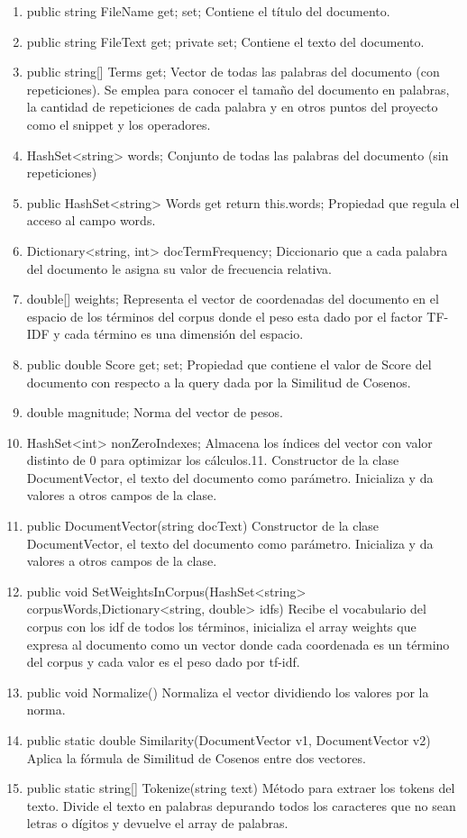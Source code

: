 \documentclass[a4paper,12pt,twocolumn]{article}
\begin{document}
\begin{enumerate}
    \item public string FileName {get; set; }
    Contiene el título del documento.
    \item public string FileText {get; private set; }
    Contiene el texto del documento.
    \item public string[] Terms{ get;}
    Vector de todas las palabras del documento (con repeticiones). Se emplea para conocer el
    tamaño del documento en palabras, la cantidad de repeticiones de cada palabra y en otros puntos
    del proyecto como el snippet y los operadores.
    \item HashSet<string> words;
    Conjunto de todas las palabras del documento (sin repeticiones)
    \item public HashSet<string> Words { get { return this.words; } }
    Propiedad que regula el acceso al campo words.
    \item Dictionary<string, int> docTermFrequency;
    Diccionario que a cada palabra del documento le asigna su valor de frecuencia relativa.
    \item double[] weights;
    Representa el vector de coordenadas del documento en el espacio de los términos del corpus
    donde el peso esta dado por el factor TF-IDF y cada término es una dimensión del espacio.
    \item public double Score { get; set; }
    Propiedad que contiene el valor de Score del documento con respecto a la query dada por la
    Similitud de Cosenos.
    \item double magnitude;
    Norma del vector de pesos.
    \item HashSet<int> nonZeroIndexes;
    Almacena los índices del vector con valor distinto de 0 para optimizar los cálculos.11. Constructor de la clase 
    DocumentVector, el texto del documento como parámetro. Inicializa y da
    valores a otros campos de la clase.
    \item public DocumentVector(string docText) {}
    Constructor de la clase DocumentVector, el texto del documento como parámetro. Inicializa y da
    valores a otros campos de la clase.
    \item public void SetWeightsInCorpus(HashSet<string> corpusWords,Dictionary<string, double> idfs) {}
     Recibe el vocabulario del corpus con los idf de todos los términos, inicializa el array weights que
    expresa al documento como un vector donde cada coordenada es un término del corpus y cada
    valor es el peso dado por tf-idf.
    \item public void Normalize() {}
    Normaliza el vector dividiendo los valores por la norma.
    \item public static double Similarity(DocumentVector v1, DocumentVector v2){}
    Aplica la fórmula de Similitud de Cosenos entre dos vectores.
    \item public static string[] Tokenize(string text) {}
    Método para extraer los tokens del texto. Divide el texto en palabras depurando todos los
    caracteres que no sean letras o dígitos y devuelve el array de palabras.
\end{enumerate}
    
\end{document}
